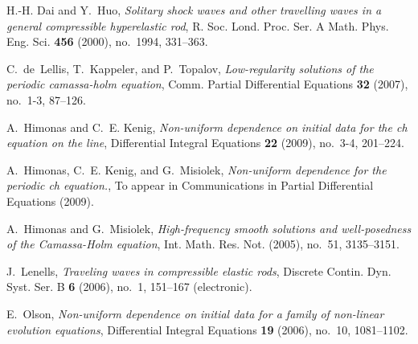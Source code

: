 \documentclass[12pt,reqno]{amsart}
\begin{document}
\begin{thebibliography}{dLKT07}
H.-H. Dai and Y.~Huo, \emph{Solitary shock waves and other travelling waves in
  a general compressible hyperelastic rod}, R. Soc. Lond. Proc. Ser. A Math.
  Phys. Eng. Sci. \textbf{456} (2000), no.~1994, 331--363.

C.~de~Lellis, T.~Kappeler, and P.~Topalov, \emph{Low-regularity solutions of
  the periodic camassa-holm equation}, Comm. Partial Differential Equations
  \textbf{32} (2007), no.~1-3, 87--126.

A.~Himonas and C.~E. Kenig, \emph{Non-uniform dependence on initial data for
  the ch equation on the line}, Differential Integral Equations \textbf{22}
  (2009), no.~3-4, 201--224.

A.~Himonas, C.~E. Kenig, and G.~Misiolek, \emph{Non-uniform dependence for the
  periodic ch equation.}, To appear in Communications in Partial Differential
  Equations (2009).

A.~Himonas and G.~Misiolek, \emph{High-frequency smooth solutions and
  well-posedness of the {C}amassa-{H}olm equation}, Int. Math. Res. Not.
  (2005), no.~51, 3135--3151. 

J.~Lenells, \emph{Traveling waves in compressible elastic rods}, Discrete
  Contin. Dyn. Syst. Ser. B \textbf{6} (2006), no.~1, 151--167 (electronic).

E.~Olson, \emph{Non-uniform dependence on initial data for a family of
  non-linear evolution equations}, Differential Integral Equations \textbf{19}
  (2006), no.~10, 1081--1102.

\end{thebibliography}
%
%
\end{document}
